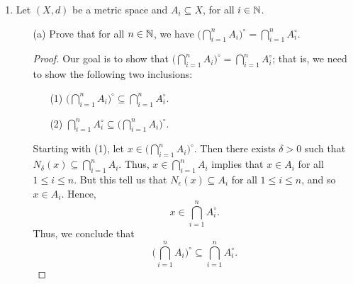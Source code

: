 \documentclass[a4paper]{article}
\begin{document}
\begin{enumerate}
\begin{enumerate}
            \end{enumerate}
        \item Let \( (X,d) \) be a metric space and \( {A}_{i} \subseteq X  \), for all \( i \in \mathbb{N}  \).
            \begin{enumerate}
                \item[(a)] Prove that for all \( n \in \mathbb{N}  \), we have \( \Big(  \bigcap_{ i =1  }^{ n }  {A}_{i} \Big)^{\circ} = \bigcap_{ i = 1  }^{ n }  {A}_{i}^{\circ} \).
                    \begin{proof}
                    Our goal is to show that \( \Big(  \bigcap_{ i =1  }^{ n }  {A}_{i} \Big)^{\circ} = \bigcap_{ i = 1  }^{ n }  {A}_{i}^{\circ} \); that is, we need to show the following two inclusions: 
                    \begin{enumerate}
                        \item[(1)] \( \Big(  \bigcap_{ i=1  }^{ n }  {A}_{i} \Big)^{\circ} \subseteq \bigcap_{ i=1 }^{ n }  {A}_{i}^{\circ} \).
                        \item[(2)] \( \bigcap_{ i=1 }^{ n }  {A}_{i}^{\circ} \subseteq \Big(  \bigcap_{ i=1  }^{ n }  {A}_{i} \Big)^{\circ} \). 
                    \end{enumerate}
           Starting with (1), let \( x \in \Big(  \bigcap_{ i=1 }^{ n }  {A}_{i} \Big)^{\circ}  \). Then there exists \( \delta > 0  \) such that \( {N}_{\delta}(x) \subseteq \bigcap_{  i =1  }^{ n }  {A}_{i}  \). Thus, \( x \in \bigcap_{ i=1 }^{ n } {A}_{i} \) implies that \( x \in {A}_{i} \) for all \( 1 \leq i \leq n \). But this tell us that \( {N}_{\epsilon}(x) \subseteq {A}_{i} \) for all \( 1 \leq i \leq n  \), and so \( x \in A_{i} \). Hence,  
           \[  x \in \bigcap_{ i=1 }^{ n } {A}_{i}^{\circ}. \]
           Thus, we conclude that 
           \[  \Big(  \bigcap_{ i=1 }^{ n } {A}_{i} \Big)^{\circ} \subseteq \bigcap_{ i=1 }^{ n } {A}_{i}^{\circ}. \]


\end{proof}
\end{enumerate}
\end{enumerate}
\end{document}
